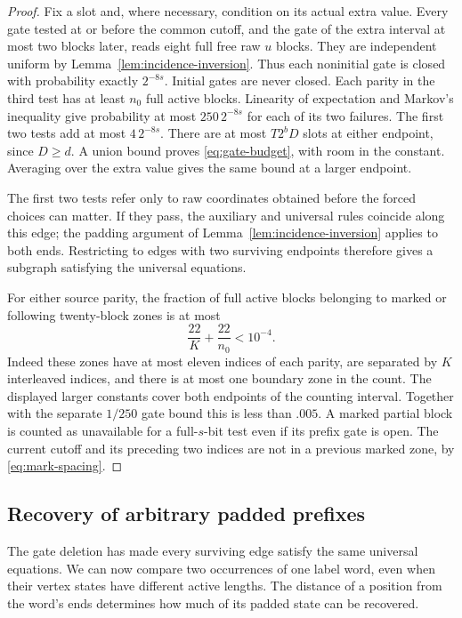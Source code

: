 \begin{proof}
Fix a slot and, where necessary, condition on its actual extra value.
Every gate tested at or before the common cutoff, and the gate of the
extra interval at most two blocks later, reads eight full free raw
$u$ blocks.  They are independent uniform by
Lemma~\ref{lem:incidence-inversion}.  Thus each noninitial gate is closed
with probability exactly $2^{-8s}$.  Initial gates are never closed.
Each parity in the third test has at least $n_0$ full active blocks.
Linearity of expectation and Markov's inequality give probability at
most $250\,2^{-8s}$ for each of its two failures.  The first two tests
add at most $4\,2^{-8s}$.  There are at most $T2^bD$ slots at either
endpoint, since $D\ge d$.  A union bound proves
\eqref{eq:gate-budget}, with room in the constant.  Averaging over the
extra value gives the same bound at a larger endpoint.

The first two tests refer only to raw coordinates obtained before the
forced choices can matter.  If they pass, the auxiliary and universal
rules coincide along this edge; the padding argument of
Lemma~\ref{lem:incidence-inversion} applies to both ends.  Restricting to
edges with two surviving endpoints therefore gives a subgraph satisfying
the universal equations.

For either source parity, the fraction of full active blocks belonging
to marked or following twenty-block zones is at most
\[
 \frac{22}{K}+\frac{22}{n_0}<10^{-4}.
\]
Indeed these zones have at most eleven indices of each parity, are
separated by $K$ interleaved indices, and there is at most one boundary
zone in the count.  The displayed larger constants cover both endpoints
of the counting interval.  Together with the separate $1/250$ gate
bound this is less than $.005$.  A marked partial block is counted as
unavailable for a full-$s$-bit test even if its prefix gate is open.
The current cutoff and its preceding two indices are not in a previous
marked zone, by \eqref{eq:mark-spacing}.
\end{proof}

\subsection{Recovery of arbitrary padded prefixes}

The gate deletion has made every surviving edge satisfy the same
universal equations.  We can now compare two occurrences of one label
word, even when their vertex states have different active lengths.
The distance of a position from the word's ends determines how much
of its padded state can be recovered.

